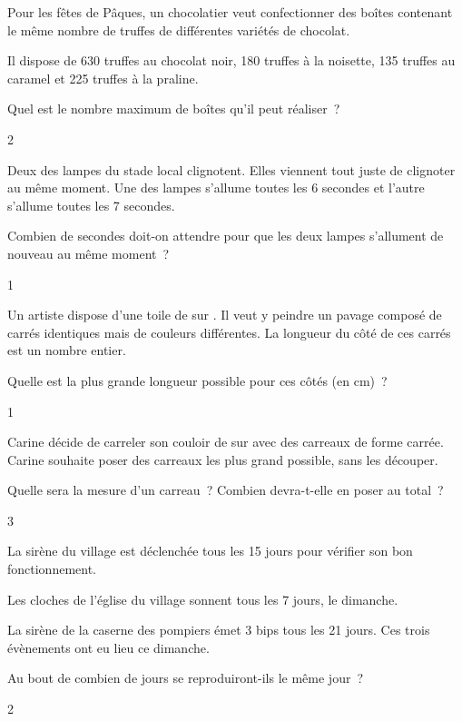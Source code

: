 \documentclass[a4paper,11pt]{report}
\begin{document}
\begin{exo}{  %
    Pour les fêtes de Pâques, un chocolatier veut confectionner des boîtes contenant le même nombre de truffes   de différentes variétés de chocolat. 

    Il dispose de 630 truffes au chocolat noir, 180 truffes à la noisette, 135 truffes au caramel et 225 truffes à la praline. 

    Quel est le nombre maximum de boîtes qu'il peut réaliser~?
}{2}\end{exo}




\begin{exo}{ %
    Deux des lampes du stade local clignotent. Elles viennent tout juste de clignoter au même moment. Une des lampes s'allume toutes les  6 secondes et l'autre s'allume toutes les 7 secondes.

    Combien de secondes doit-on attendre pour que les deux lampes s'allument de nouveau au même moment~? 
}{1}\end{exo}



\begin{exo}{ %
		Un artiste dispose d'une toile de  sur . Il veut y peindre un pavage composé de carrés identiques mais de couleurs différentes. La longueur du côté de ces carrés est un nombre entier. 

    Quelle est la plus grande longueur possible pour ces côtés (en cm)~?
}{1}\end{exo}



\begin{exo}{ %
		Carine décide de carreler son couloir de  sur  avec des carreaux de forme carrée. Carine souhaite poser des carreaux les plus grand possible, sans les découper.
    \begin{tasks}[label-width = 1em ,item-indent = 2em ,before-skip = -0.4em, after-skip = -0.4em , label-offset=0.666em,after-item-skip = 0.3em]
        \task Quelle sera la mesure d'un carreau~?
        \task Combien devra-t-elle en poser au total~?
    \end{tasks}
}{3}\end{exo}







\begin{exo}{ %
    La sirène du village est déclenchée tous les 15 jours pour vérifier son bon fonctionnement. 

    Les cloches de l'église du village sonnent tous les 7 jours, le dimanche. 

    La sirène de la caserne des pompiers émet 3 bips tous les 21 jours. Ces trois évènements ont eu lieu ce dimanche. 

    Au bout de combien de jours se reproduiront-ils le même jour~?
}{2}\end{exo}
\end{document}
